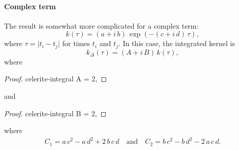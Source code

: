 \documentclass[modern]{aastex62}
\begin{document}
\paragraph{Complex term}

The result is somewhat more complicated for a complex term:
\begin{equation}
k(\tau) = (a + i\,b)\,\exp\left(-(c+i\,d)\,\tau\right),
\end{equation}
where $\tau = \vert t_i-t_j \vert$ for times $t_i$ and $t_j$.
In this case, the integrated kernel is
\begin{equation}
k_\Delta(\tau) = (A + i\,B)\,k(\tau),
\end{equation}
where
\begin{proof}{celerite-integral}
  A = 2,
\end{proof}
and
\begin{proof}{celerite-integral}
  B = 2,
\end{proof}
where
\begin{align}
C_1 = a\,c^2 - a\,d^2 + 2\,b\,c\,d
\quad\mathrm{and}\quad
C_2 = b\,c^2 - b\,d^2 - 2\,a\,c\,d.
\end{align}
\end{document}
